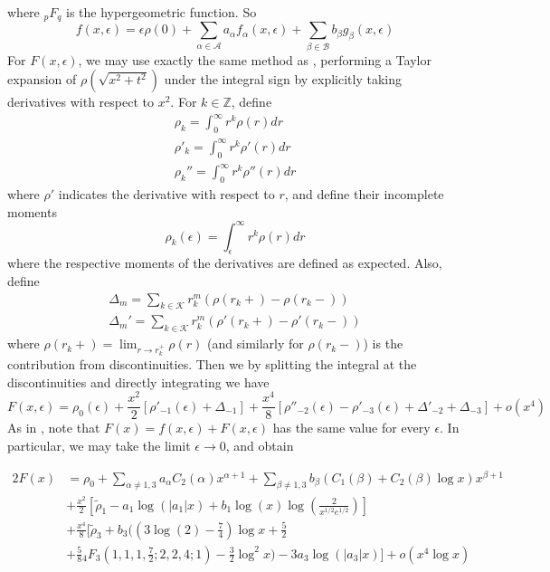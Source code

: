 \documentclass{article}
\newcommand{\ttz}[0]{\rightarrow 0}
\begin{document}
where ${_p}F_q$ is the hypergeometric function. So
\begin{equation}
    f(x,\epsilon) = \epsilon\rho(0) + \sum_{\alpha \in \mathcal{A}} a_{\alpha}f_{\alpha}(x,\epsilon) + \sum_{\beta \in \mathcal{B}}b_{\beta}g_{\beta}(x,\epsilon)
\end{equation}
For $F(x,\epsilon)$, we may use exactly the same method as \cite{dettmann2016random}, performing a Taylor expansion of $\rho(\sqrt{x^2+t^2})$ under the integral sign by explicitly taking derivatives with respect to $x^2$. For $k \in \mathbb{Z}$, define
\begin{align}
    \rho_k = \int_0^{\infty} r^k\rho(r)dr \nonumber \\
    \rho'_k = \int_0^{\infty} r^k \rho'(r)dr \nonumber \\
    \rho_k'' = \int_0^{\infty} r^k\rho''(r)dr
\end{align}
where $\rho'$ indicates the derivative with respect to $r$, and define their incomplete moments
\begin{equation}
    \rho_k(\epsilon) = \int_{\epsilon}^{\infty} r^k\rho(r)dr
\end{equation}
where the respective moments of the derivatives are defined as expected.
Also, define
\begin{align}
    \Delta_m = \sum_{k \in \mathcal{K}} r_k^m(\rho(r_k+) - \rho(r_k-)) \nonumber \\
    \Delta_m' = \sum_{k \in \mathcal{K}} r_k^m(\rho'(r_k+) - \rho'(r_k-))
\end{align}
where $\rho(r_k+) = \lim_{r\to r_k^+} \rho(r)$ (and similarly for $\rho(r_k-)$) is the contribution from discontinuities. Then we by splitting the integral at the discontinuities and directly integrating we have
\begin{equation}
    F(x,\epsilon) = \rho_0(\epsilon) + \frac{x^2}{2}[\rho'_{-1}(\epsilon) + \Delta_{-1}] + \frac{x^4}{8}[\rho''_{-2}(\epsilon) - \rho'_{-3}(\epsilon) + \Delta'_{-2} + \Delta_{-3}] + o(x^4)
\end{equation}
As in \cite{dettmann2016random}, note that $F(x) = f(x,\epsilon) + F(x,\epsilon)$ has the same value for every $\epsilon$. In particular, we may take the limit $\epsilon\ttz$, and obtain

\begin{alignat}{2}
    F(x) &= \rho_0 +\sum_{\alpha \neq 1,3} a_{\alpha}C_2(\alpha)x^{\alpha+1} + \sum_{\beta \neq 1,3} b_{\beta}(C_1(\beta) + C_2(\beta)\log x)x^{\beta+1} 
    \nonumber \\ &+ \frac{x^2}{2}\left[\tilde{\rho}_1 - a_1\log(|a_1|x) + b_1\log(x) \log\left(\frac{2}{x^{1/2}e^{1/2}}\right) \right] \nonumber \\ &+ \frac{x^4}{8}\Bigg[\tilde{\rho}_3 + b_3\Bigg(\left(3\log(2) - \frac{7}{4} \right)\log x + \frac{5}{2}\nonumber \\&+ \frac{5}{8}{_4}F_3\left(1,1,1,\frac{7}{2};2,2,4;1\right)-\frac{3}{2}\log^2x\Bigg) - 3a_3\log(|a_3|x)\Bigg] + o(x^4\log x)
\end{alignat}
\end{document}
